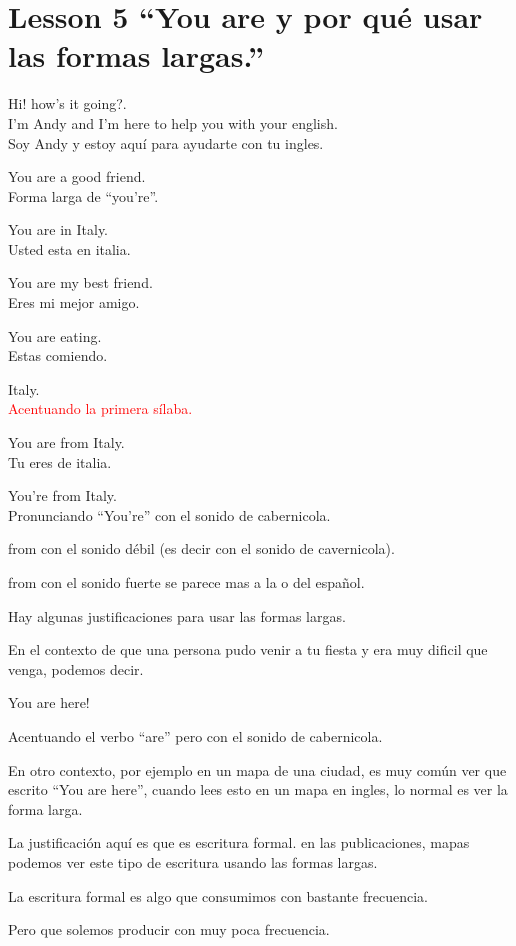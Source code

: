 \section{Lesson 5 ``You are y por qué usar las formas largas.''}

Hi! how's it going?.\\

I'm Andy and I'm here to help you with your english.\\
Soy Andy y estoy aquí para ayudarte con tu ingles.

You are a good friend.\\
Forma larga de ``you're''.

You are in Italy.\\
Usted esta en italia.

You are my best friend.\\
Eres mi mejor amigo.

You are eating.\\
Estas comiendo.

Italy.\\
\textcolor{red}{Acentuando la primera sílaba.}

You are from Italy.\\
Tu eres de italia.

You're from Italy.\\
Pronunciando ``You're'' con el sonido de cabernicola.

from con el sonido débil (es decir con el sonido de cavernicola).

from con el sonido fuerte se parece mas a la o del español.

Hay algunas justificaciones para usar las formas largas.

En el contexto de que una persona pudo venir a tu fiesta y era muy dificil
que venga, podemos decir.

You are here!

Acentuando el verbo ``are'' pero con el sonido de cabernicola.

En otro contexto, por ejemplo en un mapa de una ciudad, es muy común
ver que escrito ``You are here'', cuando lees esto en un mapa en ingles,
lo normal es ver la forma larga.

La justificación aquí es que es escritura formal. en las publicaciones, mapas
podemos ver este tipo de escritura usando las formas largas.

La escritura formal es algo que consumimos con bastante frecuencia.

Pero que solemos producir con muy poca frecuencia.

